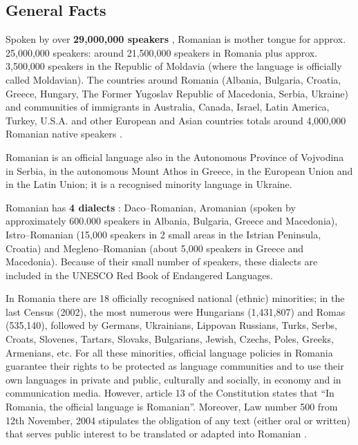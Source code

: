 \begin{multicols}{2}

\subsection{General Facts}

Spoken by over \textbf{29,000,000 speakers} \cite{vintila}, Romanian is mother tongue for approx. 25,000,000 speakers: around 21,500,000 speakers in Romania \cite{stat1} plus approx. 3,500,000 speakers in the Republic of Moldavia \cite{stat2} (where the language is officially called Moldavian). The countries around Romania (Albania, Bulgaria, Croatia, Greece, Hungary, The Former Yugoslav Republic of Macedonia, Serbia, Ukraine) and communities of immigrants in Australia, Canada, Israel, Latin America, Turkey, U.S.A. and other European and Asian countries totals around 4,000,000 Romanian native speakers \cite{urlRom_diaspora}.

Romanian is an official language also in the Autonomous Province of Vojvodina in Serbia, in the autonomous Mount Athos in Greece, in the European Union and in the Latin Union; it is a recognised minority language in Ukraine.

Romanian has \textbf{4 dialects} \cite{sala}: Daco--Romanian, Aromanian (spoken by approximately 600.000 speakers in Albania, Bulgaria, Greece and Macedonia), Istro--Romanian (15,000 speakers in 2 small areas in the Istrian Peninsula, Croatia) and Megleno--Romanian (about 5,000 speakers in Greece and Macedonia). Because of their small number of speakers, these dialects are included in the UNESCO Red Book of Endangered Languages.

In Romania there are 18 officially recognised national (ethnic) minorities; in the last Census (2002), the most numerous were Hungarians (1,431,807) and Romas (535,140), followed by Germans, Ukrainians, Lippovan Russians, Turks, Serbs, Croats, Slovenes, Tartars, Slovaks, Bulgarians, Jewish, Czechs, Poles, Greeks, Armenians, etc. For all these minorities, official language policies in Romania guarantee their rights to be protected as language communities and to use their own languages in private and public, culturally and socially, in economy and in communication media. However, article 13 of the Constitution states that “In Romania, the official language is Romanian”. Moreover, Law number 500 from 12th November, 2004 stipulates the obligation of any text (either oral or written) that serves public interest to be translated or adapted into Romanian \cite{urlEFNIL}.


\end{multicols}

